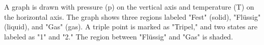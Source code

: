 A graph is drawn with pressure (p) on the vertical axis and temperature (T) on the horizontal axis. The graph shows three regions labeled "Fest" (solid), "Flüssig" (liquid), and "Gas" (gas). A triple point is marked as "Tripel," and two states are labeled as "1" and "2." The region between "Flüssig" and "Gas" is shaded.